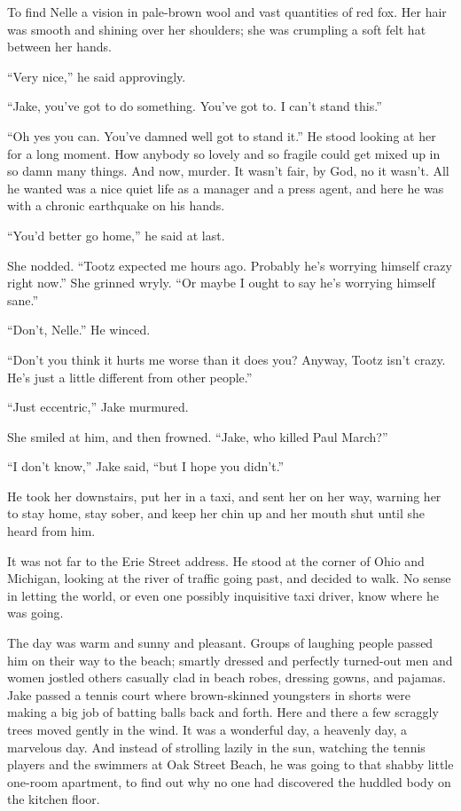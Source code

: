 \documentclass{novel}
\begin{document}
To find Nelle a vision in pale-brown wool and vast quantities of red fox. Her hair was smooth and shining over her shoulders; she was crumpling a soft felt hat between her hands.

“Very nice,” he said approvingly.

“Jake, you’ve got to do something. You’ve got to. I can’t stand this.”

“Oh yes you can. You’ve damned well got to stand it.” He stood looking at her for a long moment. How anybody so lovely and so fragile could get mixed up in so damn many things. And now, murder. It wasn’t fair, by God, no it wasn’t. All he wanted was a nice quiet life as a manager and a press agent, and here he was with a chronic earthquake on his hands.

“You’d better go home,” he said at last.

She nodded. “Tootz expected me hours ago. Probably he’s worrying himself crazy right now.” She grinned wryly. “Or maybe I ought to say he’s worrying himself sane.”

“Don’t, Nelle.” He winced.

“Don’t you think it hurts me worse than it does you? Anyway, Tootz isn’t crazy. He’s just a little different from other people.”

“Just eccentric,” Jake murmured.

She smiled at him, and then frowned. “Jake, who killed Paul March?”

“I don’t know,” Jake said, “but I hope you didn’t.”

He took her downstairs, put her in a taxi, and sent her on her way, warning her to stay home, stay sober, and keep her chin up and her mouth shut until she heard from him.

It was not far to the Erie Street address. He stood at the corner of Ohio and Michigan, looking at the river of traffic going past, and decided to walk. No sense in letting the world, or even one possibly inquisitive taxi driver, know where he was going.

The day was warm and sunny and pleasant. Groups of laughing people passed him on their way to the beach; smartly dressed and perfectly turned-out men and women jostled others casually clad in beach robes, dressing gowns, and pajamas. Jake passed a tennis court where brown-skinned youngsters in shorts were making a big job of batting balls back and forth. Here and there a few scraggly trees moved gently in the wind. It was a wonderful day, a heavenly day, a marvelous day. And instead of strolling lazily in the sun, watching the tennis players and the swimmers at Oak Street Beach, he was going to that shabby little one-room apartment, to find out why no one had discovered the huddled body on the kitchen floor.
\end{document}

